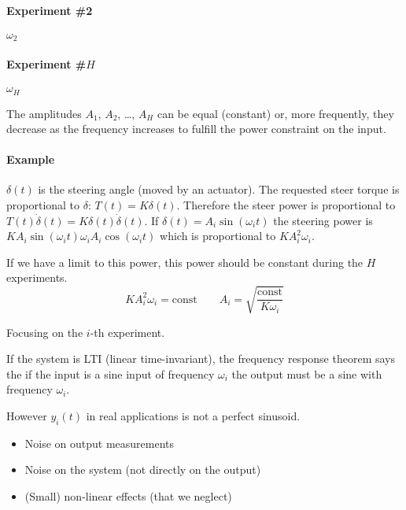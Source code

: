 \paragraph{Experiment \#2} $\omega_2$

\paragraph{Experiment \#$H$} $\omega_H$


\begin{remark}
    The amplitudes $A_1$, $A_2$, \ldots, $A_H$ can be equal (constant) or, more frequently, they decrease as the frequency increases to fulfill the power constraint on the input.

    \paragraph{Example} $\delta(t)$ is the steering angle (moved by an actuator).
    The requested steer torque is proportional to $\delta$: $T(t) = K \delta(t)$.
    Therefore the steer power is proportional to $T(t) \dot{\delta}(t) = K \delta(t)\dot{\delta}(t)$.
    If $\delta(t) = A_i\sin(\omega_it)$ the steering power is $KA_i\sin(\omega_it)\omega_iA_i\cos(\omega_it)$ which is proportional to $KA_i^2\omega_i$.

    If we have a limit to this power, this power should be constant during the $H$ experiments.
    \[KA_i^2\omega_i = \text{const} \qquad A_i=\sqrt{\frac{\text{const}}{K\omega_i}}\]
\end{remark}

Focusing on the $i$-th experiment.


\begin{remark}
    If the system is LTI (linear time-invariant), the frequency response theorem says the if the input is a sine input of frequency $\omega_i$ the output must be a sine with frequency $\omega_i$.
\end{remark}

However $y_i(t)$ in real applications is not a perfect sinusoid.
\begin{itemize}
    \item Noise on output measurements
    \item Noise on the system (not directly on the output)
    \item (Small) non-linear effects (that we neglect)
\end{itemize}

